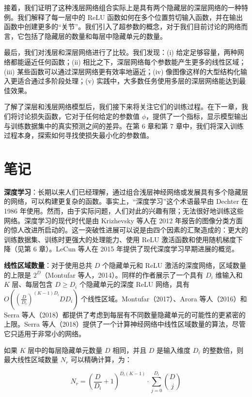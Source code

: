 接着，我们证明了这种浅层网络组合实际上是具有两个隐藏层的深层网络的一种特例。我们解释了每一层中的 ReLU 函数如何在多个位置剪切输入函数，并在输出函数中创建更多的“关节”。我们引入了超参数的概念，对于我们目前讨论的网络而言，它包括了隐藏层的数量和每层中隐藏单元的数量。

最后，我们对浅层和深层网络进行了比较。我们发现：(i) 给定足够容量，两种网络都能逼近任何函数；(ii) 相比之下，深层网络每个参数能产生更多的线性区域；(iii) 某些函数可以通过深层网络更有效率地逼近；(iv) 像图像这样的大型结构化输入更适合通过多阶段处理；(v) 实践中，大多数任务使用多层的深层网络能达到最佳效果。

了解了深层和浅层网络模型后，我们接下来将关注它们的训练过程。在下一章，我们将讨论损失函数，它对于任何给定的参数值 \(\phi\)，提供了一个指标，显示模型输出与训练数据集中的真实预测之间的差异。在第 6 章和第 7 章中，我们将深入训练过程本身，探索如何寻找使损失最小化的参数值。


\section{笔记}
\textbf{深度学习}：长期以来人们已经理解，通过组合浅层神经网络或发展具有多个隐藏层的网络，可以构建更复杂的函数。事实上，“深度学习”这个术语最早由 Dechter 在 1986 年使用。然而，由于实际问题，人们对此的兴趣有限；无法很好地训练这些网络。深度学习的现代时代是由 Krizhevsky 等人在 2012 年报告的图像分类方面的惊人改进所启动的。这一突破性进展可以说是由四个因素的汇聚造成的：更大的训练数据集、训练时更强大的处理能力、使用 ReLU 激活函数和使用随机梯度下降（见第 6 章）。LeCun 等人在 2015 年提供了现代深度学习早期进展的概览。

\textbf{线性区域数量}：对于使用总共 \(D\) 个隐藏单元和 ReLU 激活的深度网络，区域数量的上限是 \(2^D\)（Montufar 等人，2014）。同样的作者展示了一个具有 \(D_i\) 维输入和 \(K\) 层、每层包含 \(D \geq D_i\) 个隐藏单元的深度 ReLU 网络，具有 \(O\left(\left(\frac{D}{D_i}\right)^{(K-1)D_i}D D_i\right)\) 个线性区域。Montufar（2017）、Arora 等人（2016）和 Serra 等人（2018）都提供了考虑到每层有不同数量隐藏单元的可能性的更紧密的上限。Serra 等人（2018）提供了一个计算神经网络中线性区域数量的算法，尽管它只适用于非常小的网络。

如果 \(K\) 层中的每层隐藏单元数量 \(D\) 相同，并且 \(D\) 是输入维度 \(D_i\) 的整数倍，则最大线性区域数量 \(N_r\) 可以精确计算，为：

\begin{equation}
N_r = \left( \frac{D}{D_i} + 1 \right)^{D_i(K-1)} \cdot \sum_{j=0}^{D_i} \binom{D}{j} 
\end{equation}

